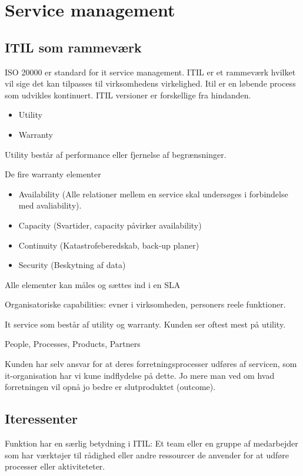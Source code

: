 \section{Service management}
\subsection{ITIL som rammeværk}
ISO 20000 er standard for it service management. ITIL er et rammeværk hvilket vil sige det kan tilpasses til virksomhedens virkelighed.
Itil er en løbende process som udvikles kontinuert. ITIL versioner er forskellige fra hindanden.

\begin{itemize}
\item Utility
\item Warranty
\end{itemize}

Utility består af performance eller fjernelse af begrænsninger.

De fire warranty elementer
\begin{itemize}
\item Availability (Alle relationer mellem en service skal undersøges i forbindelse med avaliability).
\item Capacity (Svartider, capacity påvirker availability)
\item Continuity (Katastrofeberedskab, back-up planer)
\item Security (Beskytning af data)
\end{itemize}

Alle elementer kan måles og sættes ind i en SLA

Organisatoriske capabilities: evner i virksomheden, personers reele funktioner.

It service som består af utility og warranty. Kunden ser oftest mest på utility.

People, Processes, Products, Partners

Kunden har selv ansvar for at deres forretningsprocesser udføres af servicen, som it-organisation har vi kune indflydelse på dette. Jo mere man ved om hvad forretningen vil opnå jo bedre er slutproduktet (outcome).

\subsection{Iteressenter}
Funktion har en særlig betydning i ITIL: Et team eller en gruppe af medarbejder som har værktøjer til rådighed eller andre ressourcer de anvender for at udføre processer eller aktiviteteter.

